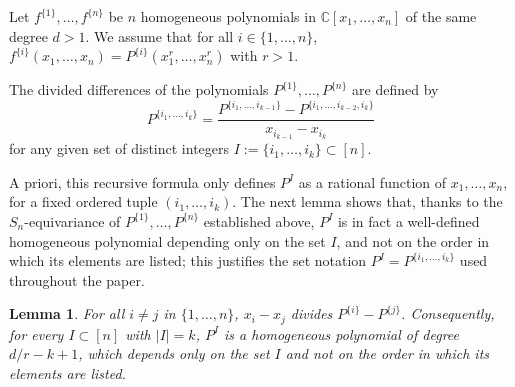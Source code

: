 \documentclass[12pt]{amsart}
\newtheorem{lemma}[theorem]{Lemma}
\theoremstyle{definition}
\begin{document}
Let $f^{\{1\}},\dots,f^{\{n\}}$ be $n$ homogeneous polynomials in $\mathbb{C}[x_1,\dots,x_n]$ of the same degree $d > 1$. We assume that for all $i \in \{1,\dots,n\}$, $f^{\{i\}}(x_1,\dots,x_n) = P^{\{i\}}(x_1^r,\dots,x_n^r)$ with $r > 1$.

The divided differences of the polynomials $P^{\{1\}},\dots,P^{\{n\}}$ are defined by
\[
P^{\{i_1,\dots,i_k\}} = \frac{P^{\{i_1,\dots,i_{k-1}\}} - P^{\{i_1,\dots,i_{k-2},i_k\}}}{x_{i_{k-1}} - x_{i_k}}
\]
for any given set of distinct integers $I := \{i_1,\dots,i_k\} \subset [n]$.

A priori, this recursive formula only defines $P^I$ as a rational function of $x_1,\dots,x_n$, for a fixed ordered tuple $(i_1,\dots,i_k)$. The next lemma shows that, thanks to the $S_n$-equivariance of $P^{\{1\}},\dots,P^{\{n\}}$ established above, $P^I$ is in fact a well-defined homogeneous polynomial depending only on the set $I$, and not on the order in which its elements are listed; this justifies the set notation $P^I = P^{\{i_1,\dots,i_k\}}$ used throughout the paper.

\begin{lemma}
\label{lem:dividedwelldefined}
For all $i \ne j$ in $\{1,\dots,n\}$, $x_i - x_j$ divides $P^{\{i\}} - P^{\{j\}}$. Consequently, for every $I \subset [n]$ with $|I|=k$, $P^I$ is a homogeneous polynomial of degree $d/r - k + 1$, which depends only on the set $I$ and not on the order in which its elements are listed.
\end{lemma}
\end{document}
